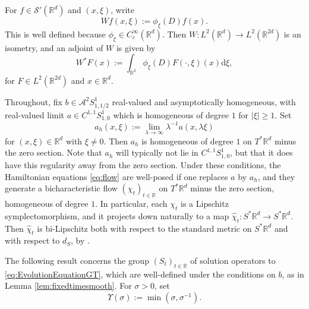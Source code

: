 \documentclass{amsart}
\numberwithin{equation}{section}
\theoremstyle{definition}
\newcommand{\R}{\mathbb{R}}
\newcommand{\Rd}{\mathbb{R}^{d}}
\newcommand {\A}{\mathcal{A}}
\newcommand {\ud}{\mathrm{d}}
\newcommand {\la}{\lambda}
\newcommand {\Sp}{S^{*}\Rd}
\newcommand {\Sw}{\mathcal{S}}
\begin{document}
For $f\in \Sw'(\Rd)$ and $(x,\xi)$, write
\begin{equation}\label{eq:defW}
Wf(x,\xi):=\phi_{\xi}(D)f(x).
\end{equation}
This is well defined because $\phi_{\xi}\in C^{\infty}_{c}(\Rd)$. Then $W:L^{2}(\Rd)\to L^{2}(\R^{2d})$ is an isometry, and an adjoint of $W$ is given by 
\[
W^{*}F(x):=\int_{\R^{2}}\phi_{\xi}(D)F(\cdot,\xi)(x)\ud \xi,
\]
for $F\in L^{2}(\R^{2d})$ and $x\in\Rd$.

Throughout, fix $b\in \A^{2}S^{1}_{1,1/2}$ real-valued and asymptotically homogeneous, with real-valued limit $a\in C^{1,1}S^{1}_{1,0}$ which is homogeneous of degree $1$ for $|\xi|\geq 1$. Set 
\[
a_{h}(x,\xi):=\lim_{\la\to\infty}\la^{-1}a(x,\la\xi)
\]
for $(x,\xi)\in\Rd$ with $\xi\neq 0$. Then $a_{h}$ is homogeneous of degree $1$ on $T^{*}\Rd$ minus the zero section. Note that $a_{h}$ will typically not lie in $C^{1,1}S^{1}_{1,0}$, but that it does have this regularity away from the zero section.  Under these conditions, the Hamiltonian equations \eqref{eq:flow} are well-posed if one replaces $a$ by $a_{h}$, and they generate a bicharacteristic flow $(\chi_{t})_{t\in\R}$ on $T^{*}\Rd$ minus the zero section, homogeneous of degree $1$. In particular, each $\chi_{t}$ is a Lipschitz symplectomorphism, and it projects down naturally to a map $\hat{\chi}_{t}:\Sp\to \Sp$. Then $\hat{\chi}_{t}$ is bi-Lipschitz both with respect to the standard metric on $\Sp$ and with respect to $d_{S}$, by \cite[Proposition 2.4]{HassellPortalRozendaal2020}.

The following result concerns the group $(S_{t})_{t\in\R}$ of solution operators to \eqref{eq:EvolutionEquationGT}, which are well-defined under the conditions on $b$, as in Lemma \ref{lem:fixedtimesmooth}. For $\sigma>0$, set
\begin{equation*}
    \Upsilon(\sigma) := \min(\sigma,\sigma^{-1}).
\end{equation*}
\end{document}
